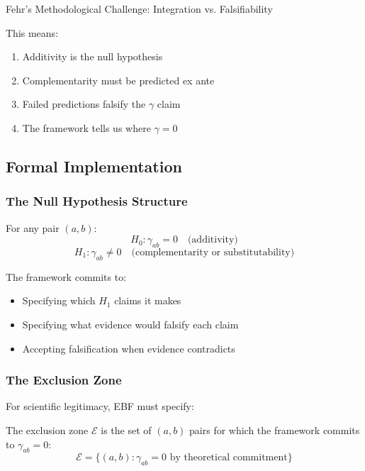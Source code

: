 \begin{chapter}{Fehr's Methodological Challenge: Integration vs. Falsifiability}
\begin{tcolorbox}[colback=green!5!white,colframe=green!75!black,title=\textbf{Fehr-Compatible EBF Principle}]
\vspace{0.5em}
This means:
\begin{enumerate}
    \item Additivity is the null hypothesis
    \item Complementarity must be predicted ex ante
    \item Failed predictions falsify the $\gamma$ claim
    \item The framework tells us where $\gamma = 0$
\end{enumerate}
\end{tcolorbox}

\subsection{Formal Implementation}

\subsubsection{The Null Hypothesis Structure}

For any pair $(a, b)$:
\begin{equation}
H_0: \gamma_{ab} = 0 \quad \text{(additivity)}
\end{equation}
\begin{equation}
H_1: \gamma_{ab} \neq 0 \quad \text{(complementarity or substitutability)}
\end{equation}

The framework commits to:
\begin{itemize}[noitemsep]
    \item Specifying which $H_1$ claims it makes
    \item Specifying what evidence would falsify each claim
    \item Accepting falsification when evidence contradicts
\end{itemize}

\subsubsection{The Exclusion Zone}

For scientific legitimacy, EBF must specify:

\begin{definition}
The exclusion zone $\mathcal{E}$ is the set of $(a, b)$ pairs for which the framework commits to $\gamma_{ab} = 0$:
\[
\mathcal{E} = \{(a,b) : \gamma_{ab} = 0 \text{ by theoretical commitment}\}
\]
\end{definition}


\end{chapter}

